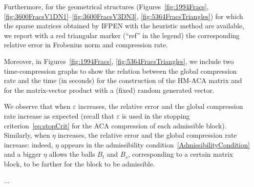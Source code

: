 Furthermore, for the geometrical structures (Figures~\ref{fig:1994Fracs}, \ref{fig:3600FracsV1DN1}--\ref{fig:3600FracsV3DN3}, \ref{fig:5364FracsTriangles}) for which the sparse matrices obtained by IFPEN with the heuristic method are available, we report with a red triangular marker (``ref'' in the legend) the corresponding relative error in Frobenius norm and compression rate.

Moreover, in Figures~\ref{fig:1994Fracs}, \ref{fig:5364FracsTriangles}, we include two time-compression graphs to show the relation between the global compression rate and the time (in seconds) for the construction of the HM-ACA matrix and for the matrix-vector product with a (fixed) random generated vector.   

\medskip
We observe that when $\varepsilon$ increases, the relative error and the global compression rate increase as expected (recall that $\varepsilon$ is used in the stopping criterion~\eqref{eq:stopCrit} for the ACA compression of each admissible block).
Similarly, when $\eta$ increases, the relative error and the global compression rate increase: indeed, $\eta$ appears in the admissibility condition~\eqref{AdmissibilityCondition} and a bigger $\eta$ allows the balls $B_t$ and $B_s$, corresponding to a certain matrix block, to be farther for the block to be admissible.

... 









